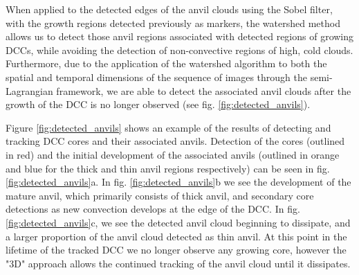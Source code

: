 When applied to the detected edges of the anvil clouds using the Sobel filter, with the growth regions detected previously as markers, the watershed method allows us to detect those anvil regions associated with detected regions of growing DCCs, while avoiding the detection of non-convective regions of high, cold clouds.
Furthermore, due to the application of the watershed algorithm to both the spatial and temporal dimensions of the sequence of images through the semi-Lagrangian framework, we are able to detect the associated anvil clouds after the growth of the DCC is no longer observed (see fig. \ref{fig:detected_anvils}).

Figure \ref{fig:detected_anvils} shows an example of the results of detecting and tracking DCC cores and their associated anvils.
Detection of the cores (outlined in red) and the initial development of the associated anvils (outlined in orange and blue for the thick and thin anvil regions respectively) can be seen in fig. \ref{fig:detected_anvils}a.
In fig. \ref{fig:detected_anvils}b we see the development of the mature anvil, which primarily consists of thick anvil, and secondary core detections as new convection develops at the edge of the DCC.
In fig. \ref{fig:detected_anvils}c, we see the detected anvil cloud beginning to dissipate, and a larger proportion of the anvil cloud detected as thin anvil.
At this point in the lifetime of the tracked DCC we no longer observe any growing core, however the "3D" approach allows the continued tracking of the anvil cloud until it dissipates.


